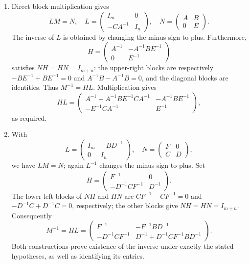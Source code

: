 \begin{solution}
\begin{enumerate}
\item Direct block multiplication gives
\[
LM=N,\quad
L=\begin{pmatrix}I_m&0\\-CA^{-1}&I_n\end{pmatrix},\quad
N=\begin{pmatrix}A&B\\0&E\end{pmatrix}.
\]
The inverse of \(L\) is obtained by changing the minus sign to plus.
Furthermore,
\[
H=\begin{pmatrix}A^{-1}&-A^{-1}BE^{-1}\\0&E^{-1}\end{pmatrix}
\]
satisfies \(NH=HN=I_{m+n}\): the upper-right blocks are respectively
\(-BE^{-1}+BE^{-1}=0\) and \(A^{-1}B-A^{-1}B=0\), and the diagonal
blocks are identities. Thus \(M^{-1}=HL\). Multiplication gives
\[
HL=\begin{pmatrix}
A^{-1}+A^{-1}BE^{-1}CA^{-1}&-A^{-1}BE^{-1}\\
-E^{-1}CA^{-1}&E^{-1}
\end{pmatrix},
\]
as required.
\item With
\[
L=\begin{pmatrix}I_m&-BD^{-1}\\0&I_n\end{pmatrix},\quad
N=\begin{pmatrix}F&0\\C&D\end{pmatrix},
\]
we have \(LM=N\); again \(L^{-1}\) changes the minus sign to plus.
Set
\[
H=\begin{pmatrix}F^{-1}&0\\-D^{-1}CF^{-1}&D^{-1}\end{pmatrix}.
\]
The lower-left blocks of \(NH\) and \(HN\) are
\(CF^{-1}-CF^{-1}=0\) and \(-D^{-1}C+D^{-1}C=0\), respectively;
the other blocks give \(NH=HN=I_{m+n}\).
Consequently
\[
M^{-1}=HL=\begin{pmatrix}
F^{-1}&-F^{-1}BD^{-1}\\
-D^{-1}CF^{-1}&D^{-1}+D^{-1}CF^{-1}BD^{-1}
\end{pmatrix}.
\]
Both constructions prove existence of the inverse under exactly the stated
hypotheses, as well as identifying its entries.
\end{enumerate}
\end{solution}

